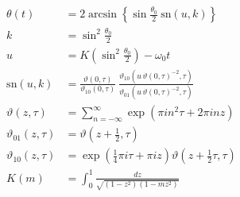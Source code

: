 \documentclass[fleqn]{article}
\begin{document}
	\begin{align}
		\theta(t) &= 2 \arcsin\!\left\lbrace \sin\frac{\theta_0}{2} \: \mathrm{sn}(u, k)\right\rbrace \\
		k &= \sin^2\frac{\theta_0}{2} \\ 
		u &= K\!\left(\sin^2\frac{\theta_0}{2}\right) -\omega_0 t \\
		\mathrm{sn}(u, k) &=  \frac{\vartheta(0, \tau)}{\vartheta_{10}(0, \tau)} \:\frac{\vartheta_{10}(u \, \vartheta(0, \tau)^{-2}, \tau)}{\vartheta_{01}(u \, \vartheta(0, \tau)^{-2}, \tau)} \\ 
		\vartheta(z, \tau) &= \sum_{n=-\infty}^{\infty} \exp(\pi i n^2 \tau + 2\pi i n z) \\
		\vartheta_{01}(z, \tau) &= \vartheta(z + \frac{1}{2}, \tau) \\
		\vartheta_{10}(z, \tau) &= \exp(\frac{1}{4}\pi i \tau + \pi i z)\vartheta(z + \frac{1}{2}\tau, \tau) \\
		K(m) &= \int_0^1 \frac{dz}{\sqrt{(1-z^2)(1-mz^2)}}
	\end{align}
\end{document}

